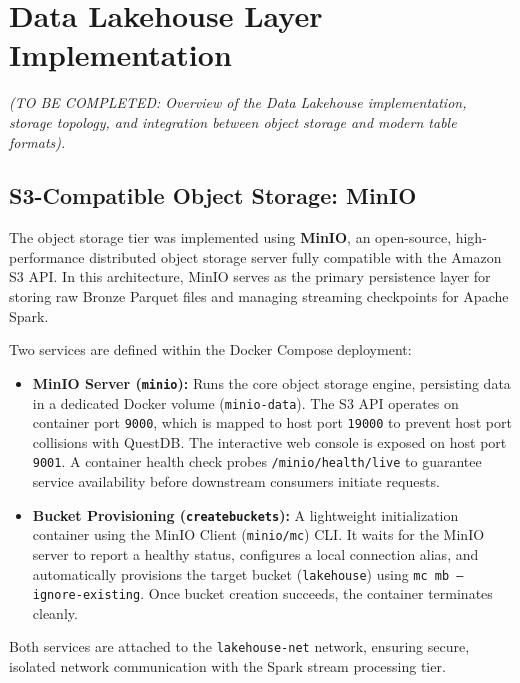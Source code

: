 \section{Data Lakehouse Layer Implementation}
\label{sec:data-lakehouse-implementation}

\textit{(TO BE COMPLETED: Overview of the Data Lakehouse implementation, storage topology, and integration between object storage and modern table formats).}

\subsection{S3-Compatible Object Storage: MinIO}
\label{subsec:minio-s3-implementation}

The object storage tier was implemented using \textbf{MinIO}, an open-source, high-performance distributed object storage server fully compatible with the Amazon S3 API. In this architecture, MinIO serves as the primary persistence layer for storing raw Bronze Parquet files and managing streaming checkpoints for Apache Spark.

Two services are defined within the Docker Compose deployment:
\begin{itemize}
    \item \textbf{MinIO Server (\texttt{minio}):} Runs the core object storage engine, persisting data in a dedicated Docker volume (\texttt{minio-data}). The S3 API operates on container port \texttt{9000}, which is mapped to host port \texttt{19000} to prevent host port collisions with QuestDB. The interactive web console is exposed on host port \texttt{9001}. A container health check probes \texttt{/minio/health/live} to guarantee service availability before downstream consumers initiate requests.
    \item \textbf{Bucket Provisioning (\texttt{createbuckets}):} A lightweight initialization container using the MinIO Client (\texttt{minio/mc}) CLI. It waits for the MinIO server to report a healthy status, configures a local connection alias, and automatically provisions the target bucket (\texttt{lakehouse}) using \texttt{mc mb --ignore-existing}. Once bucket creation succeeds, the container terminates cleanly.
\end{itemize}

Both services are attached to the \texttt{lakehouse-net} network, ensuring secure, isolated network communication with the Spark stream processing tier.

